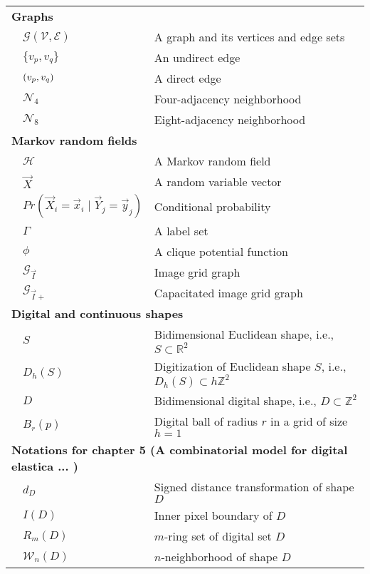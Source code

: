 {\begin{longtable}{p{0.5cm}ll}
\multicolumn{3}{l}{\textbf{Graphs}}\\
& $\mathcal{G}(\mathcal{V},\mathcal{E})$ & A graph and its vertices and edge sets \\
& $\{v_p,v_q\}$ & An undirect edge \\ 
& $( v_p,v_q )$ & A direct edge \\
& $\mathcal{N}_4$ & Four-adjacency neighborhood \\
& $\mathcal{N}_8$ & Eight-adjacency neighborhood \\[1em]


\multicolumn{3}{l}{\textbf{Markov random fields}}\\
& $\mathcal{H}$ & A Markov random field\\
& $\vec{X}$ & A random variable vector \\
& $Pr(\vec{X}_i=\vec{x}_i\;|\;\vec{Y}_j=\vec{y}_j )$ & Conditional probability \\
& $\Gamma$ & A label set \\
& $\phi$ & A clique potential function \\
& $\mathcal{G}_{\vec{I}}$ & Image grid graph \\
& $\mathcal{G}_{\vec{I}+}$ & Capacitated image grid graph\\[1em]

\multicolumn{3}{l}{\textbf{Digital and continuous shapes}}\\
& $S$ & Bidimensional Euclidean shape, i.e.,  $S \subset \mathbb{R}^2$\\
& $D_h(S)$ & Digitization of Euclidean shape $S$, i.e., $D_h(S) \subset h\mathbb{Z}^2$ \\
& $D$ & Bidimensional digital shape, i.e., $D \subset \mathbb{Z}^2$\\
& $B_r(p)$ & Digital ball of radius $r$  in a grid of size $h=1$ \\[1em]

\multicolumn{3}{l}{\textbf{Notations for chapter 5 (A combinatorial model for digital elastica ... )}}\\
& $d_D$ & Signed distance transformation of shape $D$\\
& $I(D)$ & Inner pixel boundary of $D$\\
& $R_m(D)$ & $m$-ring set of digital set $D$\\
& $\mathcal{W}_n(D)$ & $n$-neighborhood of shape $D$\\[1em]


\end{longtable}}
